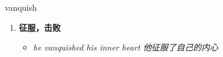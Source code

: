 
\begin{frame}
{\huge vanquish}
\begin{center}
\begin{enumerate}\Large
  \item \textbf{征服，击败}
  \begin{itemize}
    \item \em{\Large{he vanquished his inner heart 他征服了自己的内心}}
  \end{itemize}
\end{enumerate}
\end{center}
\end{frame}
